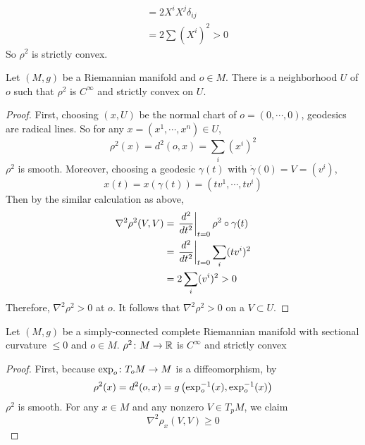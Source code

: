 \begin{enumerate}[label=\arabic{*}.]
\begin{exam}
\begin{equation*}
\begin{aligned}
				&= 2X^iX^j \delta_{ij}\\
				&= 2\sum(X^i)^2 > 0
			\end{aligned}
		\end{equation*}
		So $\rho^2$ is strictly convex.
	\end{exam}
	\begin{lem}
		Let $(M,g)$ be a Riemannian manifold and $o \in M$. There is a neighborhood $U$ of $o$ such that $\rho^2$ is $C^\infty$ and strictly convex on $U$.
	\end{lem}
	\begin{proof}
		First, choosing $(x,U)$ be the normal chart of $o = (0,\cdots,0)$, geodesics are radical lines. So for any $x = (x^1,\cdots,x^n) \in U$,
		\begin{equation*}
			\rho^2(x) = d^2(o,x) = \sum_{i}(x^i)^2
		\end{equation*}
		$\rho^2$ is smooth. Moreover, choosing a geodesic $\gamma(t)$ with $\dot{\gamma}(0) = V = (v^i)$,
		\begin{equation*}
			x(t) = x(\gamma(t)) = (tv^1,\cdots,tv^i)
		\end{equation*}
		Then by the similar calculation as above, 
		\begin{equation*}
			\begin{aligned}
				\nabla^2\rho^2(V,V) &= \left.\frac{d^2}{dt^2}\right\lvert_{t=0}\rho^2\circ \gamma(t) \\
				&= \left.\frac{d^2}{dt^2}\right\lvert_{t=0}\sum_{i}(tv^i)^2 \\
				&= 2 \sum_{i}(v^i)^2 > 0
			\end{aligned}
		\end{equation*}
		Therefore, $\nabla^2\rho^2 > 0$ at $o$. It follows that $\nabla^2\rho^2 > 0$ on a $V \subset U$.
	\end{proof}
	\begin{thm}\label{thm:distconv}
		Let $(M,g)$ be a simply-connected complete Riemannian manifold with sectional curvature $\leq 0$ and $o \in M$. $\rho^2 \colon M \rightarrow \mathbb{R}$ is $C^\infty$ and strictly convex
	\end{thm}
	\begin{proof}
		First, because $\exp_o \colon T_oM \rightarrow M$ is a diffeomorphism,  by
		\begin{equation*}
			\rho^2(x) = d^2(o,x) = g\left(\exp_o^{-1}(x),\exp_o^{-1}(x)\right)
		\end{equation*}
		$\rho^2$ is smooth. For any $x \in M$ and any nonzero $V \in T_pM$, we claim
		\begin{equation*}
			\nabla^2\rho_x(V,V) \geq 0

\end{equation*}
\end{proof}
\end{enumerate}

